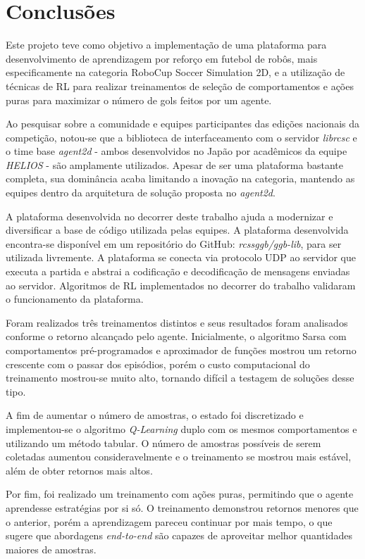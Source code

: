 
\chapter{Conclusões}
\label{chap:Conclusoes}

Este projeto teve como objetivo a implementação de uma plataforma para desenvolvimento de aprendizagem por reforço em futebol de robôs, mais especificamente na categoria RoboCup Soccer Simulation 2D, e a utilização de técnicas de RL para realizar treinamentos de seleção de comportamentos e ações puras para maximizar o número de gols feitos por um agente.

Ao pesquisar sobre a comunidade e equipes participantes das edições nacionais da competição, notou-se que a biblioteca de interfaceamento com o servidor \textit{librcsc} e o time base \textit{agent2d} - ambos desenvolvidos no Japão por acadêmicos da equipe \textit{HELIOS} - são amplamente utilizados. Apesar de ser uma plataforma bastante completa, sua dominância acaba limitando a inovação na categoria, mantendo as equipes dentro da arquitetura de solução proposta no \textit{agent2d}.

A plataforma desenvolvida no decorrer deste trabalho ajuda a modernizar e diversificar a base de código utilizada pelas equipes. A plataforma desenvolvida encontra-se disponível em um repositório do GitHub: \textit{rcssggb/ggb-lib}, para ser utilizada livremente. A plataforma se conecta via protocolo UDP ao servidor que executa a partida e abstrai a codificação e decodificação de mensagens enviadas ao servidor. Algoritmos de RL implementados no decorrer do trabalho validaram o funcionamento da plataforma.

Foram realizados três treinamentos distintos e seus resultados foram analisados conforme o retorno alcançado pelo agente. Inicialmente, o algoritmo Sarsa com comportamentos pré-programados e aproximador de funções mostrou um retorno crescente com o passar dos episódios, porém o custo computacional do treinamento mostrou-se muito alto, tornando difícil a testagem de soluções desse tipo.

A fim de aumentar o número de amostras, o estado foi discretizado e implementou-se o algoritmo \textit{Q-Learning} duplo com os mesmos comportamentos e utilizando um método tabular. O número de amostras possíveis de serem coletadas aumentou consideravelmente e o treinamento se mostrou mais estável, além de obter retornos mais altos.

Por fim, foi realizado um treinamento com ações puras, permitindo que o agente aprendesse estratégias por si só. O treinamento demonstrou retornos menores que o anterior, porém a aprendizagem pareceu continuar por mais tempo, o que sugere que abordagens \textit{end-to-end} são capazes de aproveitar melhor quantidades maiores de amostras.

